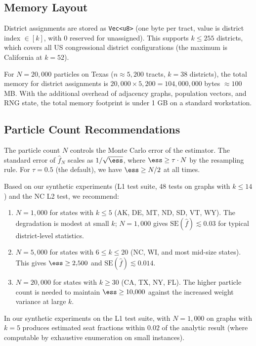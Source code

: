 \subsection{Memory Layout}

District assignments are stored as \texttt{Vec<u8>} (one byte per tract,
value is district index $\in [k]$, with 0 reserved for unassigned).
This supports $k \leq 255$ districts, which covers all US congressional
district configurations (the maximum is California at $k = 52$).

For $N = 20{,}000$ particles on Texas ($n \approx 5{,}200$ tracts, $k = 38$
districts), the total memory for district assignments is
$20{,}000 \times 5{,}200 = 104{,}000{,}000$ bytes $\approx 100$ MB.
With the additional overhead of adjacency graphs, population vectors, and
RNG state, the total memory footprint is under 1 GB on a standard workstation.

\subsection{Particle Count Recommendations}

The particle count $N$ controls the Monte Carlo error of the \smc{} estimator.
The standard error of $\hat{f}_N$ scales as $1/\sqrt{\ess}$, where
$\ess \geq \tau \cdot N$ by the resampling rule.
For $\tau = 0.5$ (the default), we have $\ess \geq N/2$ at all times.

Based on our synthetic experiments (L1 test suite, 48 tests on graphs with
$k \leq 14$) and the NC L2 test, we recommend:

\begin{enumerate}
  \item $N = 1{,}000$ for states with $k \leq 5$ (AK, DE, MT, ND, SD, VT, WY).
        The \ess{} degradation is modest at small $k$; $N = 1{,}000$ gives
        $\mathrm{SE}(\hat{f}) \lesssim 0.03$ for typical district-level statistics.
  \item $N = 5{,}000$ for states with $6 \leq k \leq 20$ (NC, WI, and
        most mid-size states).
        This gives $\ess \geq 2{,}500$ and $\mathrm{SE}(\hat{f}) \lesssim 0.014$.
  \item $N = 20{,}000$ for states with $k \geq 30$ (CA, TX, NY, FL).
        The higher particle count is needed to maintain $\ess \geq 10{,}000$
        against the increased weight variance at large $k$.
\end{enumerate}

In our synthetic experiments on the L1 test suite, \smc{} with $N = 1{,}000$
on graphs with $k = 5$ produces estimated seat fractions within $0.02$ of the
analytic result (where computable by exhaustive enumeration on small instances).

